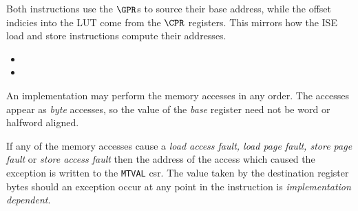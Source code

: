 Both instructions use the $\GPR$s to source their base address, while the
offset indicies into the LUT come from the $\CPR$ registers. This mirrors
how the ISE load and store instructions compute their addresses.

\begin{itemize}
\item {}
\item {}
\end{itemize}


An implementation may perform the memory accesses in any order. The accesses
appear as {\em byte} accesses, so the value of the {\em base} register
need not be word or halfword aligned.

If any of the memory accesses cause
a {\em load access fault, load page fault, store page fault} or
{\em store access fault} then the address of the access which caused the
exception is written to the {\tt MTVAL} csr. The value taken by the
destination register bytes should an exception occur at any point in the
instruction is {\em implementation dependent}.

